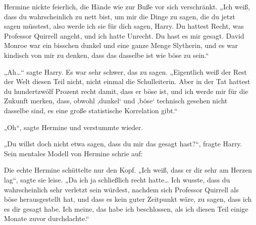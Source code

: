 Hermine nickte feierlich, die Hände wie zur Buße vor sich verschränkt.
„Ich weiß, dass du wahrscheinlich zu nett bist, um mir die Dinge zu sagen, die du jetzt sagen müsstest, also werde ich sie für dich sagen, Harry. Du hattest Recht, was Professor Quirrell angeht, und ich hatte Unrecht. Du hast es mir gesagt. David Monroe war ein bisschen dunkel und eine ganze Menge Slytherin, und es war kindisch von mir zu denken, dass das dasselbe ist wie böse zu sein.“

„Ah…“ sagte Harry. Es war sehr schwer, das zu sagen. „Eigentlich weiß der Rest der Welt diesen Teil nicht, nicht einmal die Schulleiterin. Aber in der Tat hattest du hundertzwölf Prozent recht damit, dass er böse ist, und ich werde mir für die Zukunft merken, dass, obwohl ‚dunkel‘ und ‚böse‘ technisch gesehen nicht dasselbe sind, es eine große statistische Korrelation gibt.“

„Oh“, sagte Hermine und verstummte wieder.

„Du willst doch nicht etwa sagen, dass du mir das gesagt hast?“, fragte Harry.
Sein mentales Modell von Hermine schrie auf:

Die echte Hermine schüttelte nur den Kopf. „Ich weiß, dass er dir sehr am Herzen lag“, sagte sie leise. „Da ich ja schließlich recht hatte… Ich wusste, dass du wahrscheinlich sehr verletzt sein würdest, nachdem sich Professor Quirrell als böse herausgestellt hat, und dass es kein guter Zeitpunkt wäre, zu sagen, dass ich es dir gesagt habe. Ich meine, das habe ich beschlossen, als ich diesen Teil einige Monate zuvor durchdachte.“

